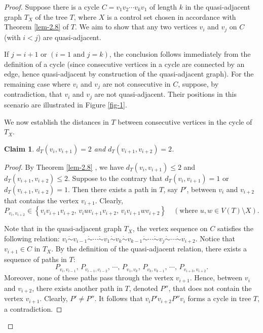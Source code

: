 \documentclass[12pt]{amsart}
\newtheorem{claim}{Claim}[section]
\begin{document}
\begin{proof}
		Suppose there is a cycle \(C = v_1v_2\cdots v_kv_1\) of length $k$ in the quasi-adjacent graph $T_X$ of the tree $T$, where $X$ is a control set 
		 chosen in accordance with Theorem \ref{lem-2.8} of $T$. 
	We aim to show that any two vertices \(v_i\) and \(v_j\) on $C$ (with \(i < j\)) are quasi-adjacent.
	
	If \(j = i+1\) or \((i=1 \text{ and } j=k)\), the conclusion follows immediately from the definition of a cycle 
	(since consecutive vertices in a cycle are connected by an edge, hence quasi-adjacent by construction of the quasi-adjacent graph).
	For the remaining case where \(v_i\) and \(v_j\) are not consecutive in $C$, suppose, by contradiction, 
	that \(v_i\) and \(v_j\) are not quasi-adjacent. 
	Their positions in this scenario are illustrated in Figure \ref{fig-1}.
	
	We now establish the distances in $T$ between consecutive vertices in the cycle of $T_X$.
	\begin{claim}\label{clm-a}
		$d_T(v_i, v_{i+1}) = 2$ and $d_T(v_{i+1}, v_{i+2}) = 2$.
	\end{claim}
	
	\begin{proof}
	        By Theorem \ref{lem-2.8} ,  we have $d_T(v_i, v_{i+1}) \leq 2$  and $d_T(v_{i+1}, v_{i+2}) \leq 2$.
		Suppose to the contrary  that $d_T(v_i, v_{i+1}) = 1$ or $d_T(v_{i+1}, v_{i+2}) = 1$. Then there exists a path in $T$, say $P'$, between $v_i$ and $v_{i+2}$ that contains the vertex $v_{i+1}$.
		Clearly, 
		$$P_{v_i, v_{i+2}} \in \left\{ v_i v_{i+1} v_{i+2}, \, v_i u v_{i+1} v_{i+2}, \, v_i v_{i+1} w v_{i+2} \right\} \quad (\text{where } u, w \in V(T) \setminus X).$$
		
		Note that in the quasi-adjacent graph $T_X$, the vertex sequence on $C$ satisfies the following relation:
		$v_i \dot{\sim} v_{i-1} \dot{\sim} \cdots \dot{\sim} v_1 \dot{\sim} v_k \dot{\sim} v_{k-1} \dot{\sim} \cdots \dot{\sim} v_j \dot{\sim} \cdots \dot{\sim} v_{i+2}.$
		Notice that $v_{i+1} \in C$ in $T_X$. By the definition of the quasi-adjacent relation, there exists a sequence of paths in $T$:
		$$P_{v_i, v_{i-1}}, \, P_{v_{i-1}, v_{i-2}}, \, \cdots, \, P_{v_1, v_k}, \, P_{v_k, v_{k-1}}, \, \cdots, \, P_{v_{i+3}, v_{i+2}}.$$
		Moreover, none of these paths pass through the vertex $v_{i+1}$. Hence, between $v_i$ and $v_{i+2}$, there exists another path in $T$, denoted $P''$, that does not contain the vertex $v_{i+1}$.
		Clearly, $P' \neq P''$. It follows that $v_i P' v_{i+2} P'' v_i$ forms a cycle in tree $T$, a contradiction.
	\end{proof}
	

\end{proof}
\end{document}
